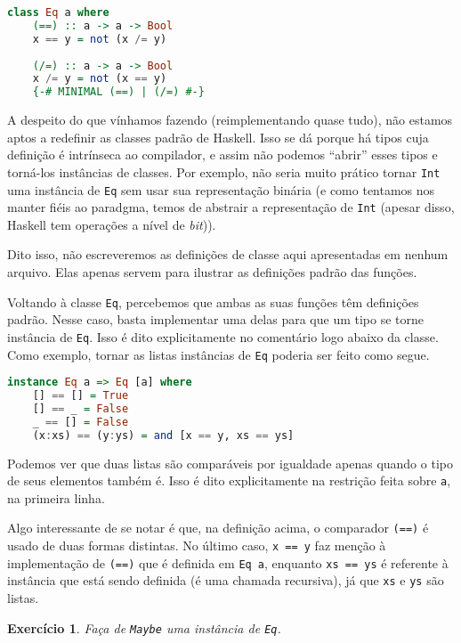\documentclass[a4paper]{article}
\newtheorem{exercicio}{Exercício}
\begin{document}
\begin{lstlisting}[language=haskell, frame=single]
class Eq a where
	(==) :: a -> a -> Bool
	x == y = not (x /= y)
	
	(/=) :: a -> a -> Bool
	x /= y = not (x == y)
	{-# MINIMAL (==) | (/=) #-}
\end{lstlisting}

A despeito do que vínhamos fazendo (reimplementando quase tudo), não estamos aptos a redefinir as classes padrão de Haskell.
Isso se dá porque há tipos cuja definição é intrínseca ao compilador, e assim não podemos ``abrir'' esses tipos e torná-los instâncias de classes.
Por exemplo, não seria muito prático tornar \texttt{Int} uma instância de \texttt{Eq} sem usar sua representação binária (e como tentamos nos manter fiéis ao paradgma, temos de abstrair a representação de \texttt{Int} (apesar disso, Haskell tem operações a nível de \emph{bit})).

Dito isso, não escreveremos as definições de classe aqui apresentadas em nenhum arquivo.
Elas apenas servem para ilustrar as definições padrão das funções.

Voltando à classe \texttt{Eq}, percebemos que ambas as suas funções têm definições padrão.
Nesse caso, basta implementar uma delas para que um tipo se torne instância de \texttt{Eq}.
Isso é dito explicitamente no comentário logo abaixo da classe.
Como exemplo, tornar as listas instâncias de \texttt{Eq} poderia ser feito como segue.

\begin{lstlisting}[language=haskell, frame=single]
instance Eq a => Eq [a] where
	[] == [] = True
	[] == _ = False
	_ == [] = False
	(x:xs) == (y:ys) = and [x == y, xs == ys]
\end{lstlisting}

Podemos ver que duas listas são comparáveis por igualdade apenas quando o tipo de seus elementos também é.
Isso é dito explicitamente na restrição feita sobre \texttt{a}, na primeira linha.

Algo interessante de se notar é que, na definição acima, o comparador \texttt{(==)} é usado de duas formas distintas.
No último caso, \texttt{x == y} faz menção à implementação de \texttt{(==)} que é definida em \texttt{Eq a}, enquanto \texttt{xs == ys} é referente à instância que está sendo definida (é uma chamada recursiva), já que \texttt{xs} e \texttt{ys} são listas.

\begin{exercicio}
	Faça de \emph{\texttt{Maybe}} uma instância de \emph{\texttt{Eq}}.
\end{exercicio}
\end{document}

